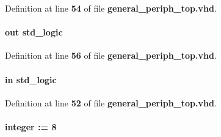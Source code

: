Definition at line {\bf 54} of file {\bf general\+\_\+periph\+\_\+top.\+vhd}.

\paragraph[{led3\+\_\+r}]{ {\bfseries \textcolor{keywordflow}{out}\textcolor{vhdlchar}{ }} {\bfseries \textcolor{comment}{std\+\_\+logic}\textcolor{vhdlchar}{ }} \hspace{0.3cm}{\ttfamily [Port]}}\label{classgeneral__periph__top_a72f4b51550939fe5fecacbbebe57551b}


Definition at line {\bf 56} of file {\bf general\+\_\+periph\+\_\+top.\+vhd}.

\paragraph[{led3\+\_\+r\+\_\+in}]{ {\bfseries \textcolor{keywordflow}{in}\textcolor{vhdlchar}{ }} {\bfseries \textcolor{comment}{std\+\_\+logic}\textcolor{vhdlchar}{ }} \hspace{0.3cm}{\ttfamily [Port]}}\label{classgeneral__periph__top_a0f3ac834a3d2bfc5dae8292ab90f6e2f}


Definition at line {\bf 52} of file {\bf general\+\_\+periph\+\_\+top.\+vhd}.

\paragraph[{N\+\_\+\+G\+P\+IO}]{ {\bfseries \textcolor{vhdlchar}{ }} {\bfseries \textcolor{comment}{integer}\textcolor{vhdlchar}{ }\textcolor{vhdlchar}{ }\textcolor{vhdlchar}{\+:}\textcolor{vhdlchar}{=}\textcolor{vhdlchar}{ }\textcolor{vhdlchar}{ } \textcolor{vhdldigit}{8} \textcolor{vhdlchar}{ }} \hspace{0.3cm}{\ttfamily [Generic]}}\label{classgeneral__periph__top_aae0bc71fcf5c9c9288df07f9d6c837f1}


